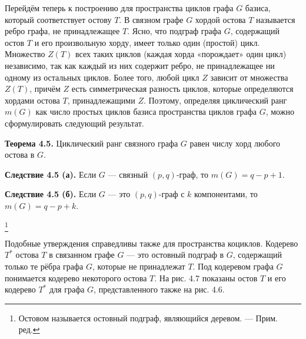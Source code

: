 Перейдём теперь к построению для пространства циклов графа $G$ базиса, который соответствует остову $T$. В связном графе $G$ хордой остова $T$ называется ребро графа, не принадлежащее $T$. Ясно, что подграф графа $G$, содержащий остов $T$ и его произвольную хорду, имеет только один (простой) цикл. Множество $Z(T)$ всех таких циклов (каждая хорда «порождает» один цикл) независимо, так как каждый из них содержит ребро, не принадлежащее ни одному из остальных циклов. Более того, любой цикл $Z$ зависит от множества $Z(T)$, причём $Z$ есть симметрическая разность циклов, которые определяются хордами остова $T$, принадлежащими $Z$. Поэтому, определяя циклический ранг $m(G)$ как число простых циклов базиса пространства циклов графа $G$, можно сформулировать следующий результат.

\textbf{Теорема 4.5.} Циклический ранг связного графа $G$ равен числу хорд любого остова в $G$.

\textbf{Следствие 4.5 (а).} Если $G$ — связный $(p, q)$-граф, то $m(G) = q - p + 1$.

\textbf{Следствие 4.5 (б).} Если $G$ — это $(p, q)$-граф с $k$ компонентами, то $m(G) = q - p + k$.

\footnote{Остовом называется остовный подграф, являющийся деревом. — Прим. ред.}

Подобные утверждения справедливы также для пространства коциклов.
Кодерево $T^*$ остова $T$ в связанном графе $G$ --- это остовный подграф в $G$, содержащий только те рёбра графа $G$, которые не принадлежат $T$.
Под кодеревом графа $G$ понимается кодерево некоторого остова $T$.
На рис. 4.7 показаны остов $T$ и его кодерево $T^*$ для графа $G$, представленного также на рис. 4.6.

